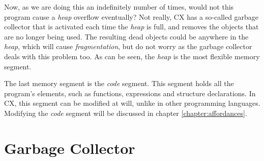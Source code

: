\documentclass[11pt,fleqn,openany]{book} %
\begin{document}
Now, as we are doing this an indefinitely number of times, would not this program cause a \emph{heap} overflow eventually? Not really, CX has a so-called garbage collector that is activated each time the \emph{heap} is full, and removes the objects that are no longer being used. The resulting dead objects could be anywhere in the \emph{heap}, which will cause \emph{fragmentation}, but do not worry as the garbage collector deals with this problem too. As can be seen, the \emph{heap} is the most flexible memory segment.

The last memory segment is the \emph{code} segment. This segment holds all the program's elements, such as functions, expressions and structure declarations. In CX, this segment can be modified at will, unlike in other programming languages. Modifying the \emph{code} segment will be discussed in chapter \ref{chapter:affordances}.%


\chapter{Garbage Collector}
\label{chapter:garbage-collector}
\end{document}
